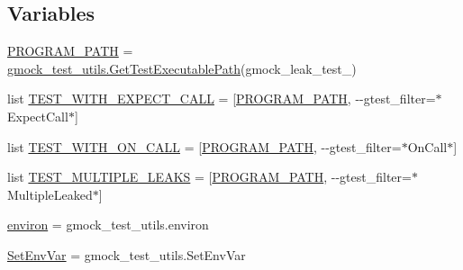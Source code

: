 \subsection*{Variables}
\begin{DoxyCompactItemize}
\item 
\mbox{\hyperlink{namespacegoogletest-master_1_1googlemock_1_1test_1_1gmock__leak__test_acf890d6080bede105120d7731d9edd8f}{P\+R\+O\+G\+R\+A\+M\+\_\+\+P\+A\+TH}} = \mbox{\hyperlink{namespacegoogletest-master_1_1googlemock_1_1test_1_1gmock__test__utils_a96f12a02ddad3510eb506e45a7aeb27b}{gmock\+\_\+test\+\_\+utils.\+Get\+Test\+Executable\+Path}}(\textquotesingle{}gmock\+\_\+leak\+\_\+test\+\_\+\textquotesingle{})
\item 
list \mbox{\hyperlink{namespacegoogletest-master_1_1googlemock_1_1test_1_1gmock__leak__test_a4d62187d387c2c6bdb28ffd1dbb47229}{T\+E\+S\+T\+\_\+\+W\+I\+T\+H\+\_\+\+E\+X\+P\+E\+C\+T\+\_\+\+C\+A\+LL}} = \mbox{[}\mbox{\hyperlink{namespacegoogletest-master_1_1googlemock_1_1test_1_1gmock__leak__test_acf890d6080bede105120d7731d9edd8f}{P\+R\+O\+G\+R\+A\+M\+\_\+\+P\+A\+TH}}, \textquotesingle{}-\/-\/gtest\+\_\+filter=$\ast$Expect\+Call$\ast$\textquotesingle{}\mbox{]}
\item 
list \mbox{\hyperlink{namespacegoogletest-master_1_1googlemock_1_1test_1_1gmock__leak__test_ac8732ca6944d4ef2846924e89bcb227e}{T\+E\+S\+T\+\_\+\+W\+I\+T\+H\+\_\+\+O\+N\+\_\+\+C\+A\+LL}} = \mbox{[}\mbox{\hyperlink{namespacegoogletest-master_1_1googlemock_1_1test_1_1gmock__leak__test_acf890d6080bede105120d7731d9edd8f}{P\+R\+O\+G\+R\+A\+M\+\_\+\+P\+A\+TH}}, \textquotesingle{}-\/-\/gtest\+\_\+filter=$\ast$On\+Call$\ast$\textquotesingle{}\mbox{]}
\item 
list \mbox{\hyperlink{namespacegoogletest-master_1_1googlemock_1_1test_1_1gmock__leak__test_ab0a35b99a382dfb5b36fdb33e1d731c7}{T\+E\+S\+T\+\_\+\+M\+U\+L\+T\+I\+P\+L\+E\+\_\+\+L\+E\+A\+KS}} = \mbox{[}\mbox{\hyperlink{namespacegoogletest-master_1_1googlemock_1_1test_1_1gmock__leak__test_acf890d6080bede105120d7731d9edd8f}{P\+R\+O\+G\+R\+A\+M\+\_\+\+P\+A\+TH}}, \textquotesingle{}-\/-\/gtest\+\_\+filter=$\ast$Multiple\+Leaked$\ast$\textquotesingle{}\mbox{]}
\item 
\mbox{\hyperlink{namespacegoogletest-master_1_1googlemock_1_1test_1_1gmock__leak__test_a0f80b6cdceba9a3580989eb38bfd0cb6}{environ}} = gmock\+\_\+test\+\_\+utils.\+environ
\item 
\mbox{\hyperlink{namespacegoogletest-master_1_1googlemock_1_1test_1_1gmock__leak__test_a976dd70a04845ce57a18c33512d2c1d8}{Set\+Env\+Var}} = gmock\+\_\+test\+\_\+utils.\+Set\+Env\+Var
\end{DoxyCompactItemize}


